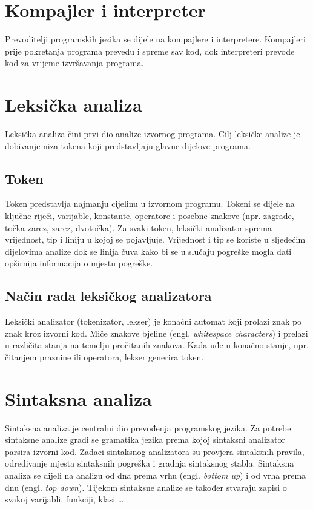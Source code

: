 \documentclass[times, utf8, zavrsni]{fer}
\begin{document}
\section{Kompajler i interpreter}
Prevoditelji programskih jezika se dijele na kompajlere i interpretere. Kompajleri prije pokretanja programa prevedu i spreme sav kod, dok interpreteri 
prevode kod za vrijeme izvršavanja programa. \cite{compilerint}

\section{Leksička analiza}
Leksička analiza čini prvi dio analize izvornog programa. Cilj leksičke analize je dobivanje niza tokena koji predstavljaju glavne dijelove programa. \cite{ppj}

\subsection{Token}
Token predstavlja najmanju cijelinu u izvornom programu. Tokeni se dijele na ključne riječi, varijable, konstante, operatore i posebne znakove (npr. zagrade, točka zarez, zarez, dvotočka).
Za svaki token, leksički analizator sprema vrijednost, tip i liniju u kojoj se pojavljuje. Vrijednost i tip se koriste u sljedećim dijelovima analize dok se linija čuva kako bi se u slučaju pogreške mogla
dati opširnija informacija o mjestu pogreške.

\subsection{Način rada leksičkog analizatora}
Leksički analizator (tokenizator, lekser) je konačni automat koji prolazi znak po znak kroz izvorni kod. Miče znakove bjeline (engl. \textit{whitespace characters}) i prelazi u različita stanja na temelju pročitanih znakova.
Kada uđe u konačno stanje, npr. čitanjem praznine ili operatora, lekser generira token. \cite{ppj}

\section{Sintaksna analiza}
Sintaksna analiza je centralni dio prevođenja programskog jezika. Za potrebe sintaksne analize gradi se gramatika jezika prema kojoj sintaksni analizator parsira izvorni kod.
Zadaci sintaksnog analizatora su provjera sintaksnih pravila, određivanje mjesta sintaksnih pogreška i gradnja sintaksnog stabla. \cite{ppj} Sintaksna analiza se dijeli na analizu od dna prema vrhu (engl. \textit{bottom up}) i od vrha prema dnu (engl. \textit{top down}). Tijekom sintaksne analize se također stvaraju zapisi o svakoj varijabli, funkciji, klasi \dots
\end{document}
